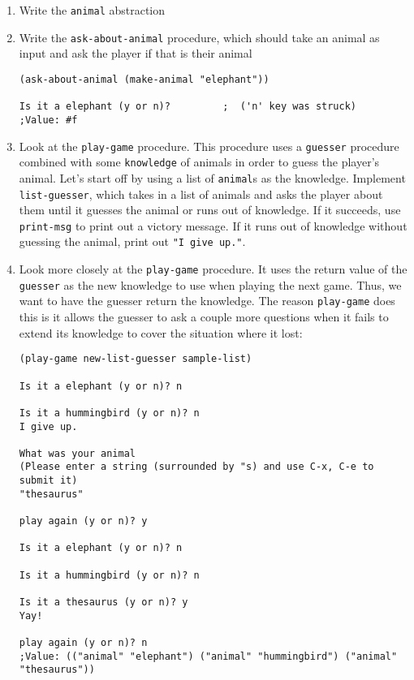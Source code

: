 \begin{enumerate}
\item Write the {\tt animal} abstraction

\item Write the {\tt ask-about-animal} procedure, which should take an
animal as input and ask the player if that is their animal
\begin{verbatim}
(ask-about-animal (make-animal "elephant"))

Is it a elephant (y or n)?         ;  ('n' key was struck)
;Value: #f
\end{verbatim}

\item Look at the {\tt play-game} procedure.  This procedure uses a
{\tt guesser} procedure combined with some {\tt knowledge} of animals
in order to guess the player's animal.  Let's start off by using a
list of {\tt animal}s as the knowledge.  Implement {\tt list-guesser},
which takes in a list of animals and asks the player about them until
it guesses the animal or runs out of knowledge.  If it succeeds, use
{\tt print-msg} to print out a victory message.  If it runs out of
knowledge without guessing the animal, print out {\tt "I give up."}.

\item Look more closely at the {\tt play-game} procedure.  It uses the
return value of the {\tt guesser} as the new knowledge to use when
playing the next game.  Thus, we want to have the guesser return the
knowledge.  The reason {\tt play-game} does this is it allows the
guesser to ask a couple more questions when it fails to extend its
knowledge to cover the situation where it lost:

\begin{verbatim}
(play-game new-list-guesser sample-list)

Is it a elephant (y or n)? n

Is it a hummingbird (y or n)? n
I give up.

What was your animal
(Please enter a string (surrounded by "s) and use C-x, C-e to submit it)
"thesaurus"

play again (y or n)? y

Is it a elephant (y or n)? n

Is it a hummingbird (y or n)? n

Is it a thesaurus (y or n)? y
Yay!

play again (y or n)? n
;Value: (("animal" "elephant") ("animal" "hummingbird") ("animal" "thesaurus"))
\end{verbatim}


\end{enumerate}
